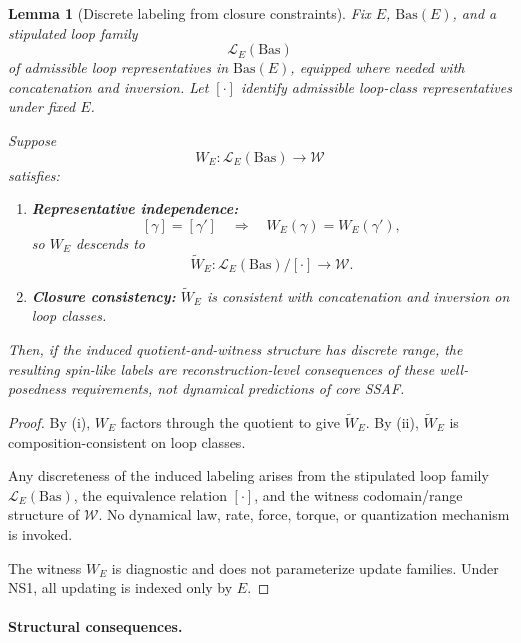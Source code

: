 \documentclass[aps,prx,onecolumn,11pt]{revtex4-2}
\theoremstyle{plain}
\newtheorem{lemma}{Lemma}
\theoremstyle{definition}
\theoremstyle{remark}
\begin{document}
\begin{lemma}[Discrete labeling from closure constraints]
\label{lem:spin_discreteness_from_closure}
Fix \(E\), \(\mathrm{Bas}(E)\), and a stipulated loop family
\[
\mathcal L_E(\mathrm{Bas})
\]
of admissible loop representatives in \(\mathrm{Bas}(E)\), equipped
where needed with concatenation and inversion. Let \([\cdot]\) identify
admissible loop-class representatives under fixed \(E\).

Suppose
\[
W_E:\mathcal L_E(\mathrm{Bas})\to\mathcal W
\]
satisfies:
\begin{enumerate}[label=(\roman*), leftmargin=2.2em]

\item \textbf{Representative independence:}
\[
[\gamma]=[\gamma']
\quad\Longrightarrow\quad
W_E(\gamma)=W_E(\gamma'),
\]
so \(W_E\) descends to
\[
\widetilde W_E:
\mathcal L_E(\mathrm{Bas})/[\cdot]
\to
\mathcal W.
\]

\item \textbf{Closure consistency:}
\(\widetilde W_E\) is consistent with concatenation and inversion on
loop classes.

\end{enumerate}

Then, if the induced quotient-and-witness structure has discrete range,
the resulting spin-like labels are reconstruction-level consequences of
these well-posedness requirements, not dynamical predictions of core
SSAF.
\end{lemma}

\begin{proof}
By (i), \(W_E\) factors through the quotient to give
\(\widetilde W_E\). By (ii), \(\widetilde W_E\) is
composition-consistent on loop classes.

Any discreteness of the induced labeling arises from the stipulated loop
family \(\mathcal L_E(\mathrm{Bas})\), the equivalence relation
\([\cdot]\), and the witness codomain/range structure of
\(\mathcal W\). No dynamical law, rate, force, torque, or quantization
mechanism is invoked.

The witness \(W_E\) is diagnostic and does not parameterize update
families. Under NS1, all updating is indexed only by \(E\).
\end{proof}

\paragraph{Structural consequences.}
\end{document}
